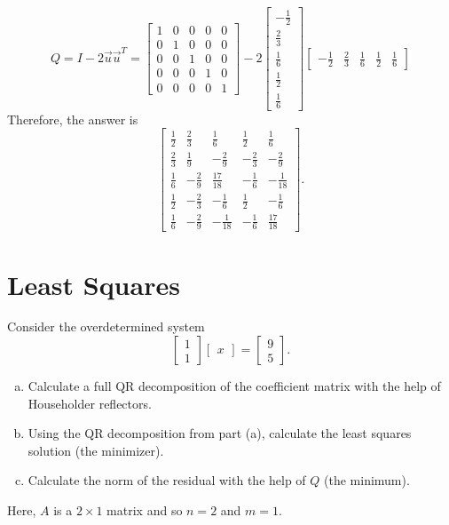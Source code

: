 \documentclass[letterpaper]{article}
\newcommand{\0}{\mathbf{0}}
\begin{document}
\[Q = I - 2\vec{u}\vec{u}^T = \begin{bmatrix}
    1 & 0 & 0 & 0 & 0 \\ 
    0 & 1 & 0 & 0 & 0 \\ 
    0 & 0 & 1 & 0 & 0 \\ 
    0 & 0 & 0 & 1 & 0 \\ 
    0 & 0 & 0 & 0 & 1 
\end{bmatrix} - 2\begin{bmatrix}
    -\frac{1}{2} \\ \frac{2}{3} \\ \frac{1}{6} \\ \frac{1}{2} \\ \frac{1}{6}
\end{bmatrix}\begin{bmatrix}
    -\frac{1}{2} & \frac{2}{3} & \frac{1}{6} & \frac{1}{2} & \frac{1}{6}
\end{bmatrix}\]
Therefore, the answer is 
\[\begin{bmatrix}
    \frac{1}{2}&\frac{2}{3}&\frac{1}{6}&\frac{1}{2}&\frac{1}{6}\\ 
    \frac{2}{3}&\frac{1}{9}&-\frac{2}{9}&-\frac{2}{3}&-\frac{2}{9}\\ 
    \frac{1}{6}&-\frac{2}{9}&\frac{17}{18}&-\frac{1}{6}&-\frac{1}{18}\\ 
    \frac{1}{2}&-\frac{2}{3}&-\frac{1}{6}&\frac{1}{2}&-\frac{1}{6}\\ 
    \frac{1}{6}&-\frac{2}{9}&-\frac{1}{18}&-\frac{1}{6}&\frac{17}{18}
\end{bmatrix}.\]




\newpage 
\section{Least Squares}
\begin{mdframed}
    Consider the overdetermined system 
    \[\begin{bmatrix}
        1 \\ 1
    \end{bmatrix} \begin{bmatrix}
        x
    \end{bmatrix} = \begin{bmatrix}
        9 \\ 5
    \end{bmatrix}.\] 
    \begin{enumerate}[(a)]
        \item Calculate a full QR decomposition of the coefficient matrix with the help of Householder reflectors.
        \item Using the QR decomposition from part (a), calculate the least squares solution (the minimizer). 
        \item Calculate the norm of the residual with the help of $Q$ (the minimum).
    \end{enumerate}
\end{mdframed}
Here, $A$ is a $2 \times 1$ matrix and so $n = 2$ and $m = 1$. 
\end{document}
